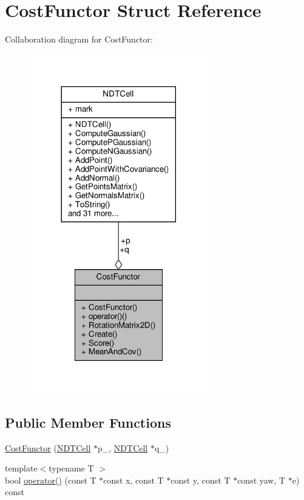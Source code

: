 \hypertarget{structCostFunctor}{}\section{Cost\+Functor Struct Reference}
\label{structCostFunctor}


Collaboration diagram for Cost\+Functor\+:\nopagebreak
\begin{figure}[H]
\begin{center}
\leavevmode
\includegraphics[width=221pt]{d4/da3/structCostFunctor__coll__graph}
\end{center}
\end{figure}
\subsection*{Public Member Functions}
\begin{DoxyCompactItemize}
\item 
\hyperlink{structCostFunctor_a970e75f6f339f881419ffebdba79ddc0}{Cost\+Functor} (\hyperlink{classNDTCell}{N\+D\+T\+Cell} $\ast$p\+\_\+, \hyperlink{classNDTCell}{N\+D\+T\+Cell} $\ast$q\+\_\+)
\item 
{\footnotesize template$<$typename T $>$ }\\bool \hyperlink{structCostFunctor_a07e825ed38e78e3a9f530b139e6b8155}{operator()} (const T $\ast$const x, const T $\ast$const y, const T $\ast$const yaw, T $\ast$e) const
\end{DoxyCompactItemize}
